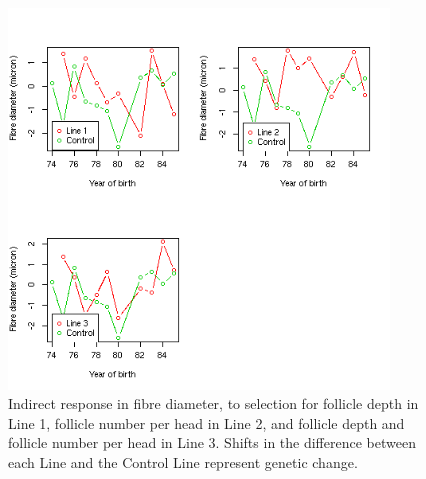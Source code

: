 %

\begin{figure}[!htp]
  \centering
   \includegraphics[width=0.9\textwidth]{dgdiam.png}
  \caption{Indirect response in fibre diameter, to selection for follicle depth in Line 1, follicle number per head in Line 2, and follicle depth and follicle number per head in Line 3. Shifts in the difference between  each Line and the  Control Line represent genetic change.}
  \label{fig:dgdiam}
\end{figure}

%


